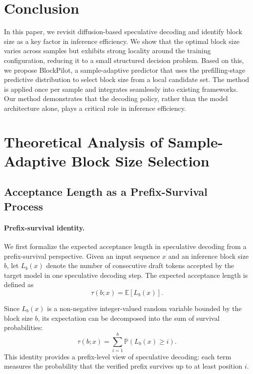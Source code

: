 \documentclass{llmxive}
\begin{document}
\section{Conclusion}
In this paper, we revisit diffusion-based speculative decoding and identify block size as a key factor in inference efficiency. We show that the optimal block size varies across samples but exhibits strong locality around the training configuration, reducing it to a small structured decision problem. Based on this, we propose BlockPilot, a  sample-adaptive predictor that uses the prefilling-stage predictive distribution to select block size from a local candidate set. The method is applied once per sample and integrates seamlessly into existing frameworks. Our method demonstrates that the decoding policy, rather than the model architecture alone, plays a critical role in inference efficiency.


% 




\appendix


\section{Theoretical Analysis of Sample-Adaptive Block Size Selection}
\label{Theoretical Analysis}

\subsection{Acceptance Length as a Prefix-Survival Process}

\paragraph{Prefix-survival identity.}
We first formalize the expected acceptance length in speculative decoding from a prefix-survival perspective. Given an input sequence $x$ and an inference block size $b$, let $L_b(x)$ denote the number of consecutive draft tokens accepted by the target model in one speculative decoding step. The expected acceptance length is defined as
\begin{equation}
\tau(b;x)
=
\mathbb{E}[L_b(x)].
\end{equation}

Since $L_b(x)$ is a non-negative integer-valued random variable bounded by the block size $b$, its expectation can be decomposed into the sum of survival probabilities:
\begin{equation}
\tau(b;x)
=
\sum_{i=1}^{b}
\mathbb{P}(L_b(x)\ge i).
\end{equation}
This identity provides a prefix-level view of speculative decoding: each term measures the probability that the verified prefix survives up to at least position $i$.
\end{document}
